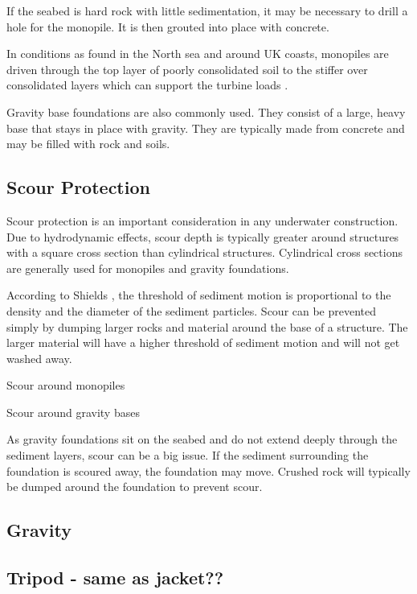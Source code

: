 \documentclass[12pt]{article} %
\begin{document}
If the seabed is hard rock with little sedimentation, it may be necessary to drill a hole for the monopile. It is then grouted into place with concrete.

In conditions as found in the North sea and around UK coasts, monopiles are driven through the top layer of poorly consolidated soil to the stiffer over consolidated layers which can support the turbine loads \cite{jf368cam.ac.uk_research}.

Gravity base foundations are also commonly used. They consist of a large, heavy base that stays in place with gravity. They are typically made from concrete and may be filled with rock and soils.


\subsection{Scour Protection}
Scour protection is an important consideration in any underwater construction.
Due to hydrodynamic effects, scour depth is typically greater around structures with a square cross section than cylindrical structures. Cylindrical cross sections are generally used for monopiles and gravity foundations.

According to Shields \cite{shields_application_1936}, the threshold of sediment motion is proportional to the density and the diameter of the sediment particles.
Scour can be prevented simply by dumping larger rocks and material around the base of a structure. The larger material will have a higher threshold of sediment motion and will not get washed away.

Scour around monopiles

Scour around gravity bases

As gravity foundations sit on the seabed and do not extend deeply through the sediment layers, scour can be a big issue.
If the sediment surrounding the foundation is scoured away, the foundation may move.
Crushed rock will typically be dumped around the foundation to prevent scour.


\subsection{Gravity}

\subsection{Tripod - same as jacket??}
\end{document}
